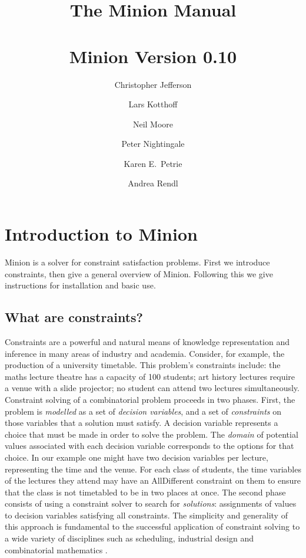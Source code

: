 \documentclass[oneside]{book}
\def\minionversion{0.10}
\begin{document}
\title{{\bf The Minion Manual}\\
~\\
Minion Version \minionversion}
\author{Christopher Jefferson \and Lars Kotthof\/f \and Neil Moore \and Peter Nightingale \and Karen E.\ Petrie \and Andrea Rendl }

\maketitle
\tableofcontents

\chapter{Introduction to Minion}

Minion is a solver for constraint satisfaction problems. First we
introduce constraints, then give a general overview of Minion. Following
this we give instructions for installation and basic use.


\section{What are constraints?}

Constraints are a powerful and natural means of knowledge representation
and inference in many areas of industry and academia. Consider, for
example, the production of a university timetable. This problem's
constraints include: the maths lecture theatre has a capacity of 100
students; art history lectures require a venue with a slide projector;
no student can attend two lectures simultaneously. Constraint solving
of a combinatorial problem proceeds in two phases. First, the problem
is \emph{modelled} as a set of \emph{decision variables}, and a set
of \emph{constraints} on those variables that a solution must satisfy.
A decision variable represents a choice that must be made in order
to solve the problem. The \emph{domain} of potential values associated
with each decision variable corresponds to the options for that choice.
In our example one might have two decision variables per lecture,
representing the time and the venue. For each class of students, the
time variables of the lectures they attend may have an AllDifferent
constraint on them to ensure that the class is not timetabled to be
in two places at once. The second phase consists of using a constraint
solver to search for \emph{solutions}: assignments of values to decision
variables satisfying all constraints. The simplicity and generality
of this approach is fundamental to the successful application of constraint
solving to a wide variety of disciplines such as scheduling, industrial
design and combinatorial mathematics \cite{wallace:Survey}.
\end{document}
